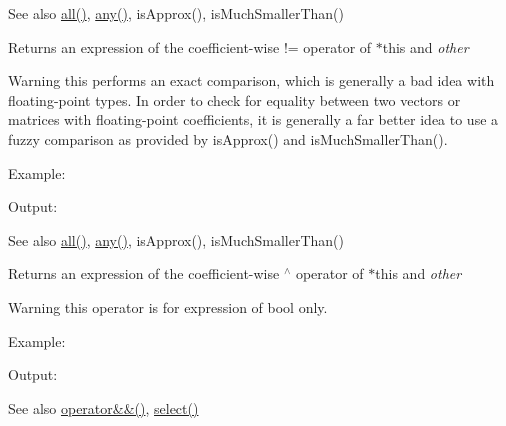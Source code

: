\begin{DoxySeeAlso}{See also}
\mbox{\hyperlink{class_eigen_1_1_dense_base_ae42ab60296c120e9f45ce3b44e1761a4}{all()}}, \mbox{\hyperlink{class_eigen_1_1_dense_base_abfbf4cb72dd577e62fbe035b1c53e695}{any()}}, is\+Approx(), is\+Much\+Smaller\+Than()
\end{DoxySeeAlso}
\begin{DoxyReturn}{Returns}
an expression of the coefficient-\/wise != operator of $\ast$this and {\itshape other} 
\end{DoxyReturn}
\begin{DoxyWarning}{Warning}
this performs an exact comparison, which is generally a bad idea with floating-\/point types. In order to check for equality between two vectors or matrices with floating-\/point coefficients, it is generally a far better idea to use a fuzzy comparison as provided by is\+Approx() and is\+Much\+Smaller\+Than().
\end{DoxyWarning}
Example\+: 
\begin{DoxyCodeInclude}{0}
\end{DoxyCodeInclude}
 Output\+: 
\begin{DoxyVerbInclude}
\end{DoxyVerbInclude}


\begin{DoxySeeAlso}{See also}
\mbox{\hyperlink{class_eigen_1_1_dense_base_ae42ab60296c120e9f45ce3b44e1761a4}{all()}}, \mbox{\hyperlink{class_eigen_1_1_dense_base_abfbf4cb72dd577e62fbe035b1c53e695}{any()}}, is\+Approx(), is\+Much\+Smaller\+Than()
\end{DoxySeeAlso}
\begin{DoxyReturn}{Returns}
an expression of the coefficient-\/wise $^\wedge$ operator of $\ast$this and {\itshape other} 
\end{DoxyReturn}
\begin{DoxyWarning}{Warning}
this operator is for expression of bool only.
\end{DoxyWarning}
Example\+: 
\begin{DoxyCodeInclude}{0}
\end{DoxyCodeInclude}
 Output\+: 
\begin{DoxyVerbInclude}
\end{DoxyVerbInclude}


\begin{DoxySeeAlso}{See also}
\mbox{\hyperlink{class_eigen_1_1_array_base_a1b3cb3e9a6f1c1e9168e963cb6e8db62}{operator\&\&()}}, \mbox{\hyperlink{class_eigen_1_1_dense_base_a65e78cfcbc9852e6923bebff4323ddca}{select()}} 
\end{DoxySeeAlso}
\mbox{\label{class_eigen_1_1_array_base_a7c2e31673c2243b135e13de05de6e636}} 
